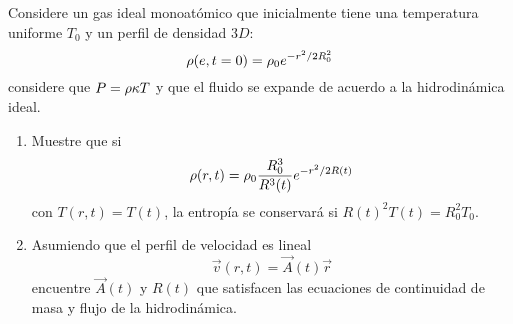 \begin{ej}
	Considere un gas ideal monoatómico que inicialmente tiene una temperatura uniforme $T_0$ y un perfil de densidad $3D$:
	\begin{equation}
  \rho(e,t=0)=\rho_0e^{-r^2/2R_0^2}
\end{equation}
considere que $P=\rho\kappa T$ y que el fluido se expande de acuerdo a la hidrodinámica ideal.
\begin{enumerate}
	\item Muestre que si
	\begin{equation}
  \rho(r,t)=\rho_0\frac{R_0^3}{R^3(t)}e^{-r^2/2R(t)}
\end{equation}
con $T(r,t)=T(t)$, la entropía se conservará si $R(t)^2T(t)=R_0^2T_0$.

\item Asumiendo que el perfil de velocidad es lineal
\begin{equation}
  \vec{v}(r,t)=\vec{A}(t)\vec{r}
\end{equation}
encuentre $\vec{A}(t)$ y $R(t)$ que satisfacen las ecuaciones de continuidad de masa y flujo de la hidrodinámica.
\end{enumerate}
\end{ej}

